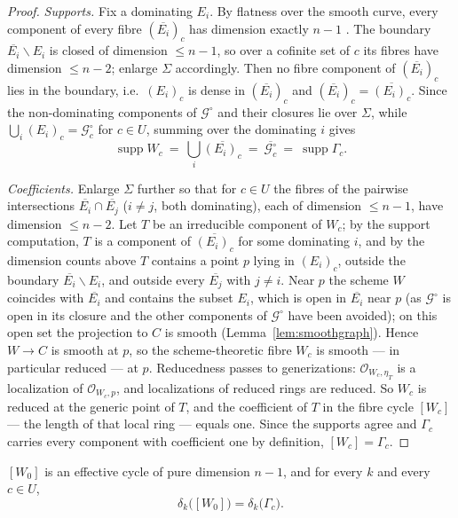 \documentclass[acmsmall,screen,nonacm]{acmart}
\theoremstyle{definition}
\theoremstyle{remark}
\DeclareMathOperator{\supp}{supp}
\newcommand{\OO}{\mathcal{O}}
\newcommand{\Gfam}{\mathcal{G}}
\newcommand{\pdeg}{\delta}
\begin{document}
\begin{proof}
\emph{Supports.}  Fix a dominating $E_i$.  By flatness over the smooth
curve, every component of every fibre $(\overline{E_i})_c$ has
dimension exactly $n-1$ \cite[III.9.5--9.6]{Hartshorne77}.  The
boundary $\overline{E_i}\smallsetminus E_i$ is closed of dimension
$\le n-1$, so over a cofinite set of $c$ its fibres have dimension
$\le n-2$; enlarge $\Sigma$ accordingly.  Then no fibre component of
$(\overline{E_i})_c$ lies in the boundary, i.e.\ $(E_i)_c$ is dense in
$(\overline{E_i})_c$ and $(\overline{E_i})_c=\overline{(E_i)_c}$.
Since the non-dominating components of $\Gfam^\circ$ and their
closures lie over $\Sigma$, while
$\bigcup_i(E_i)_c=\Gfam^\circ_c$ for $c\in U$, summing over the
dominating $i$ gives
\[
  \supp W_c\ =\ \bigcup_i\overline{(E_i)_c}
  \ =\ \overline{\Gfam^\circ_c}\ =\ \supp\Gamma_c .
\]

\emph{Coefficients.}  Enlarge $\Sigma$ further so that for $c\in U$
the fibres of the pairwise intersections
$\overline{E_i}\cap\overline{E_j}$ ($i\ne j$, both dominating), each
of dimension $\le n-1$, have dimension $\le n-2$.  Let $T$ be an
irreducible component of $W_c$; by the support computation, $T$ is a
component of $\overline{(E_i)_c}$ for some dominating $i$, and by the
dimension counts above $T$ contains a point $p$ lying in $(E_i)_c$,
outside the boundary $\overline{E_i}\smallsetminus E_i$, and outside
every $\overline{E_j}$ with $j\ne i$.  Near $p$ the scheme $W$
coincides with $\overline{E_i}$ and contains the subset $E_i$, which
is open in $\overline{E_i}$ near $p$ (as $\Gfam^\circ$ is open in its
closure and the other components of $\Gfam^\circ$ have been avoided);
on this open set the projection to $C$ is smooth
(Lemma~\ref{lem:smoothgraph}).  Hence $W\to C$ is smooth at $p$, so
the scheme-theoretic fibre $W_c$ is smooth --- in particular reduced
--- at $p$.  Reducedness passes to generizations:
$\OO_{W_c,\eta_T}$ is a localization of $\OO_{W_c,p}$, and
localizations of reduced rings are reduced.  So $W_c$ is reduced at
the generic point of $T$, and the coefficient of $T$ in the fibre
cycle $[W_c]$ --- the length of that local ring --- equals one.  Since
the supports agree and $\Gamma_c$ carries every component with
coefficient one by definition, $[W_c]=\Gamma_c$.
\end{proof}

\begin{lemma}\label{lem:conservation}
$[W_0]$ is an effective cycle of pure dimension $n-1$, and for every
$k$ and every $c\in U$,
\[
  \pdeg_k\big([W_0]\big)=\pdeg_k\big(\Gamma_c\big).
\]
\end{lemma}
\end{document}
